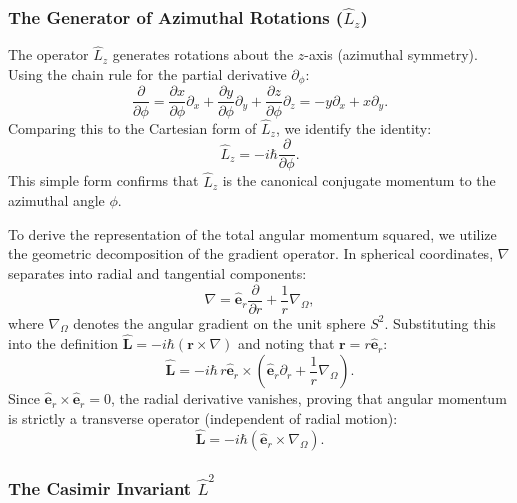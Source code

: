 \subsubsection{The Generator of Azimuthal Rotations
(\texorpdfstring{$\hat{L}_z$}{L\_z})}
The operator $\hat{L}_z$ generates rotations about the $z$-axis (azimuthal
symmetry). Using the chain rule for the partial derivative $\partial_\phi$:
\begin{equation}
  \frac{\partial}{\partial \phi} = \frac{\partial x}{\partial \phi}\partial_x
  + \frac{\partial y}{\partial \phi}\partial_y + \frac{\partial z}{\partial
  \phi}\partial_z = -y \partial_x + x \partial_y.
\end{equation}
Comparing this to the Cartesian form of $\hat{L}_z$, we identify the identity:
\begin{equation}
  \hat{L}_z = -i\hbar \frac{\partial}{\partial \phi}.
\end{equation}
This simple form confirms that $\hat{L}_z$ is the canonical conjugate momentum
to the azimuthal angle $\phi$.

To derive the representation of the total angular momentum squared, we utilize
the geometric decomposition of the gradient operator. In spherical coordinates,
$\nabla$ separates into radial and tangential components:
\begin{equation} \label{eq:grad_decomp}
  \nabla = \hat{\mathbf{e}}_r \frac{\partial}{\partial r} + \frac{1}{r}
  \nabla_{\Omega},
\end{equation}
where $\nabla_{\Omega}$ denotes the angular gradient on the unit sphere $S^2$.
Substituting this into the definition $\hat{\mathbf{L}} = -i\hbar (\mathbf{r}
\times \nabla)$ and noting that $\mathbf{r} = r \hat{\mathbf{e}}_r$:
\begin{equation}
  \hat{\mathbf{L}} = -i\hbar \, r \hat{\mathbf{e}}_r \times \left(
  \hat{\mathbf{e}}_r \partial_r + \frac{1}{r} \nabla_{\Omega} \right).
\end{equation}
Since $\hat{\mathbf{e}}_r \times \hat{\mathbf{e}}_r = 0$, the radial derivative
vanishes, proving that angular momentum is strictly a transverse operator
(independent of radial motion):
\begin{equation}
  \hat{\mathbf{L}} = -i\hbar (\hat{\mathbf{e}}_r \times \nabla_{\Omega}).
\end{equation}

\subsubsection{The Casimir Invariant \texorpdfstring{$\hat{L}^2$}{L²}}


